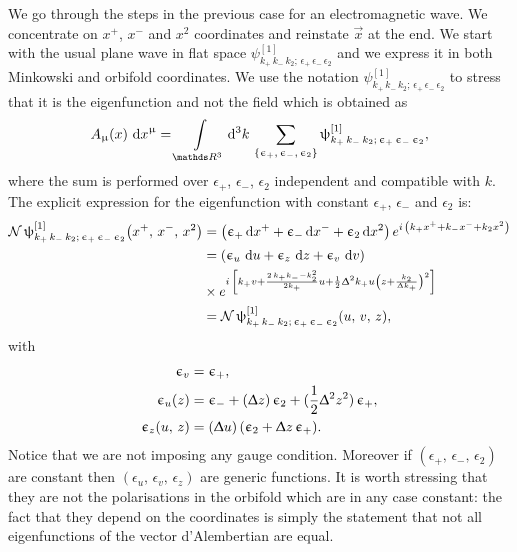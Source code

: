 We go through the steps in the previous case for an electromagnetic wave.
We concentrate on $x^+$, $x^-$ and $x^2$ coordinates and reinstate $\vec{x}$ at the end.
We start with the usual plane wave in flat space  $\psi^{[1]}_{k_+\, k_-\, k_2;\, \epsilon_+\, \epsilon_-\, \epsilon_2}$ and we express it in both Minkowski and orbifold coordinates.
We use the notation $\psi^{[1]}_{k_+\, k_-\, k_2;\, \epsilon_+\, \epsilon_-\, \epsilon_2}$ to stress that it is the eigenfunction and not the field which is obtained as
\begin{equation}
  A_{\mu}(x)\, \dd{x}^{\mu}
  =
  \int\limits_{\R^3} \dd[3]{k}\,
  \sum_{\qty{\epsilon_+,\, \epsilon_-,\, \epsilon_2}}
  \psi^{[1]}_{k_+\, k_-\, k_2;\, \epsilon_+\, \epsilon_-\, \epsilon_2},
\end{equation}
where the sum  is performed over $\epsilon_+$, $\epsilon_-$, $\epsilon_2$ independent and compatible with $k$.
The explicit expression for the eigenfunction with constant $\epsilon_+$, $\epsilon_-$ and $\epsilon_2$ is:\footnotemark{}
\begin{equation}
  \begin{split}
    \cN\,
    \psi^{[1]}_{k_+\, k_-\, k_2;\, \epsilon_+\, \epsilon_-\, \epsilon_2}\qty(x^+,\, x^-,\, x^2)
    & =
    \qty(\epsilon_+ \dd{x^+} + \epsilon_- \dd{x^-} + \epsilon_2 \dd{x^2})\,
    e^{i\, \qty( k_+ x^+ + k_- x^- + k_2 x^2 )}
    \\
    & =
    \qty( \epsilon_u\, \dd{u} + \epsilon_z\, \dd{z} + \epsilon_v\, \dd{v})\,
    \\
    & \times
    e^{%
      i\, \qty[%
        k_+ v
        +
        \frac{2\, k_+ k_- - k_2^2}{2 k_+} u
        +
        \frac{1}{2} \Delta^2 k_+ u \qty( z + \frac{k_2}{\Delta k_+})^2
      ]
    }
    \\
    & =
    \cN\,
    \psi^{[1]}_{k_+\, k_-\, k_2;\, \epsilon_+\, \epsilon_-\, \epsilon_2}\qty(u,\, v,\, z),
  \end{split}
\end{equation}
with
\begin{equation}
  \begin{split}
    \upepsilon_v & = \upepsilon_+,
    \\
    \upepsilon_u(z)
    & =
    \upepsilon_- + (\Updelta z)\, \upepsilon_2 + (\frac{1}{2} \Updelta^2 z^2)\, \upepsilon_+,
    \\
    \upepsilon_z(u,\, z)
    & =
    \qty(\Updelta u)\,
    \qty(\upepsilon_2 + \Updelta z\, \upepsilon_+ ).
  \end{split}
\end{equation}
Notice that we are not imposing any gauge condition.
Moreover if $(\epsilon_+,\, \epsilon_-,\, \epsilon_2)$ are constant then $(\epsilon_u,\, \epsilon_v,\, \epsilon_z)$ are generic functions.
It is worth stressing that they are not the polarisations in the orbifold which are in any case constant: the fact that they depend on the coordinates is simply the statement that not all eigenfunctions of the vector d'Alembertian are equal.

